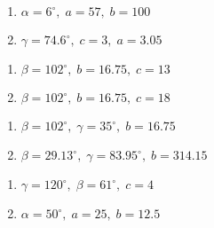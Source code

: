 \begin{multicols}{2} 

\begin{enumerate}

\setcounter{enumi}{\value{HW}}

\item $\alpha = 6^{\circ}, \; a = 57, \; b = 100$
\item $\gamma = 74.6^{\circ}, \; c = 3, \; a = 3.05$

\setcounter{HW}{\value{enumi}}

\end{enumerate}

\end{multicols}

\begin{multicols}{2} 

\begin{enumerate}

\setcounter{enumi}{\value{HW}}

\item $\beta = 102^{\circ}, \; b = 16.75, \; c = 13$
\item $\beta = 102^{\circ}, \; b = 16.75, \; c = 18$

\setcounter{HW}{\value{enumi}}

\end{enumerate}

\end{multicols}

\begin{multicols}{2} 

\begin{enumerate}

\setcounter{enumi}{\value{HW}}

\item $\beta = 102^{\circ}, \; \gamma = 35^{\circ}, \; b = 16.75$
\item $\beta = 29.13^{\circ}, \; \gamma = 83.95^{\circ}, \; b = 314.15$

\setcounter{HW}{\value{enumi}}

\end{enumerate}

\end{multicols}

\begin{multicols}{2} 

\begin{enumerate}

\setcounter{enumi}{\value{HW}}

\item $\gamma = 120^{\circ}, \; \beta = 61^{\circ}, \; c = 4$
\item $\alpha = 50^{\circ}, \; a = 25, \; b = 12.5$ \label{lastlawofsines}

\setcounter{HW}{\value{enumi}}

\end{enumerate}

\end{multicols}

